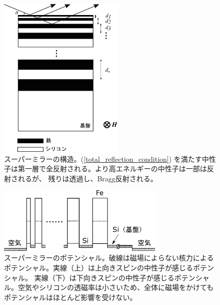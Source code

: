 \begin{figure}[H]
\centering
\includegraphics[width=6cm]{mirror/super_mirror.pdf}
\caption{スーパーミラーの構造。(\ref{total_reflection_condition})
を満たす中性子は第一層で全反射される。より高エネルギーの中性子は一部は反射されるが、
残りは透過し、Bragg反射される。\label{mirror_super_mirror}}
\vspace{-7mm}
\end{figure}
\begin{figure}[h]
\centering
\includegraphics[width=8cm]{mirror/super_mirror_potential.pdf}
\caption{スーパーミラーのポテンシャル。破線は磁場によらない核力によるポテンシャル。実線（上）は上向きスピンの中性子が感じるポテンシャル。
実線（下）は下向きスピンの中性子が感じるポテンシャル。空気やシリコンの透磁率は小さいため、全体に磁場をかけても
ポテンシャルはほとんど影響を受けない。}
\vspace{-1cm}
\end{figure}